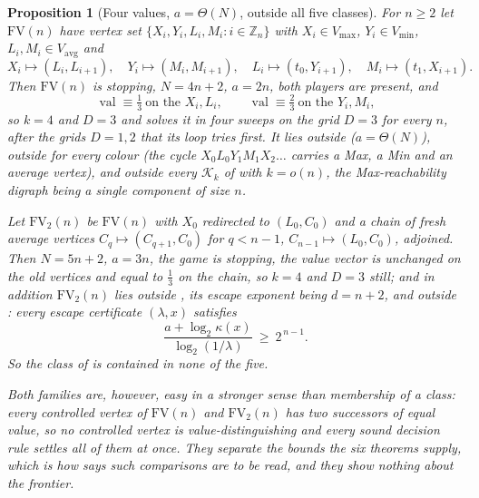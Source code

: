\documentclass[11pt]{article}
\theoremstyle{plain}
\newtheorem{proposition}[theorem]{Proposition}
\theoremstyle{definition}
\DeclareMathOperator{\val}{val}
\newcommand{\Vmax}{V_{\max}}
\newcommand{\Vmin}{V_{\min}}
\newcommand{\Vavg}{V_{\mathrm{avg}}}
\begin{document}
\begin{proposition}[Four values, $a=\Theta(N)$, outside all five classes]\label{prop:fv-family}
For $n\ge2$ let $\mathrm{FV}(n)$ have vertex set
$\{X_i,Y_i,L_i,M_i:i\in\mathbb Z_n\}$ with $X_i\in\Vmax$, $Y_i\in\Vmin$,
$L_i,M_i\in\Vavg$ and
\[
  X_i\mapsto(L_i,L_{i+1}),\quad Y_i\mapsto(M_i,M_{i+1}),\quad
  L_i\mapsto(t_0,Y_{i+1}),\quad M_i\mapsto(t_1,X_{i+1}).
\]
Then $\mathrm{FV}(n)$ is stopping, $N=4n+2$, $a=2n$, both players are
present, and
\[
  \val\equiv\tfrac13\ \text{on the }X_i,L_i,\qquad
  \val\equiv\tfrac23\ \text{on the }Y_i,M_i,
\]
so $k=4$ and $D=3$ and  solves it in four
sweeps on the grid $D=3$ for every $n$, after the grids $D=1,2$ that its
loop tries first. It lies outside  ($a=\Theta(N)$),
outside  for every colour (the cycle
$X_0L_0Y_1M_1X_2\dots$ carries a Max, a Min and an average vertex), and
outside every $\mathcal K_k$ of  with
$k=o(n)$, the Max-reachability digraph being a single component of size
$n$.

Let $\mathrm{FV}_2(n)$ be $\mathrm{FV}(n)$ with $X_0$ redirected to
$(L_0,C_0)$ and a chain of fresh average vertices
$C_q\mapsto(C_{q+1},C_0)$ for $q<n-1$, $C_{n-1}\mapsto(L_0,C_0)$,
adjoined. Then $N=5n+2$, $a=3n$, the game is stopping, the value vector is
unchanged on the old vertices and equal to $\tfrac13$ on the chain, so
$k=4$ and $D=3$ still; and in addition $\mathrm{FV}_2(n)$ lies outside
, its escape exponent being $d=n+2$, and outside
: every escape certificate $(\lambda,x)$ satisfies
\[
  \frac{a+\log_2\kappa(x)}{\log_2(1/\lambda)}\ \ge\ 2^{\,n-1}.
\]
So the class of  is contained in none of the
five.

Both families are, however, easy in a stronger sense than membership of a
class: every controlled vertex of $\mathrm{FV}(n)$ and $\mathrm{FV}_2(n)$
has two successors of \emph{equal} value, so no controlled vertex is
value-distinguishing and every sound decision rule settles all of them at
once. They separate the \emph{bounds} the six theorems supply, which is
how  says such comparisons are to be read, and
they show nothing about the frontier.
\end{proposition}
\end{document}

